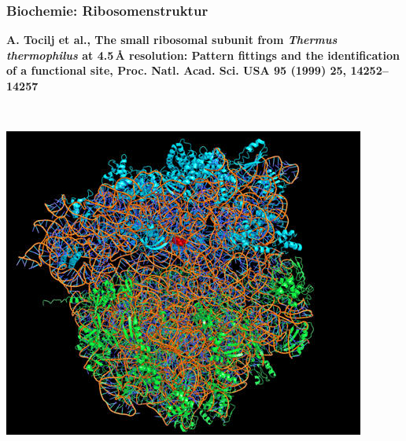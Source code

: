 \documentclass[10pt,t]{beamer}
\begin{document}
\begin{frame}
\frametitle{Biochemie: Ribosomenstruktur}
\vspace*{-2.6\baselineskip}
\alert{\bfseries\footnotesize A. Tocilj et al., The small ribosomal subunit from \textit{Thermus thermophilus} at 4.5\,\AA{} resolution: Pattern fittings and the identification of a functional site, Proc. Natl. Acad. Sci. USA 95 (1999) 25, 14252--14257 \cite{Tocilj1999}}
\vspace*{\baselineskip}
\begin{columns}
~\\[-\baselineskip]
    \includegraphics[width=\textwidth]{ribosom-struktur}
    \vspace*{-1ex}


\end{columns}
\end{frame}
\end{document}

